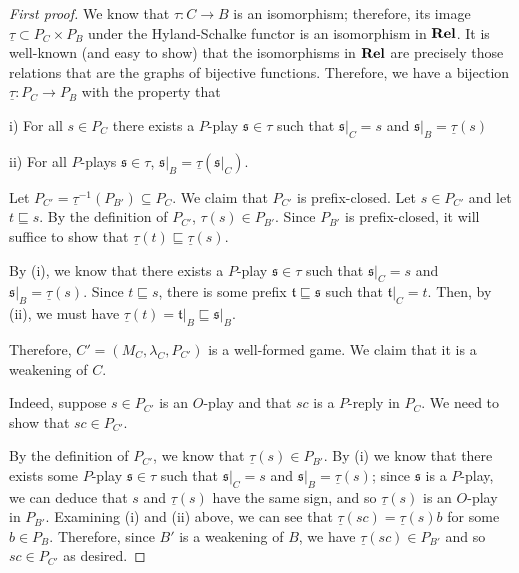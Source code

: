 \documentclass[11pt]{article} %
\theoremstyle{plain} %
\theoremstyle{definition} %
\theoremstyle{exercisestyle}
\newcommand{\catname}[1]{{\normalfont\textbf{#1}}}
\newcommand{\Rel}{\catname{Rel}}
\newcommand*\from{\colon}
\newcommand{\cmap}[3]{#1\from{}#2\to{}#3}
\def \inv {^{-1}}
\newcommand{\s}{\mathfrak{s}}
\renewcommand{\t}{\mathfrak{t}}
\newcommand{\grel}[1]{\underline{#1}}
\newcommand{\prefix}{\sqsubseteq}
\begin{document}
\begin{proof}[First proof]
  We know that $\cmap{\tau}{C}{B}$ is an isomorphism; therefore, its image $\grel\tau\subset P_C\times P_B$ under the Hyland-Schalke functor is an isomorphism in $\Rel$.  It is well-known (and easy to show) that the isomorphisms in $\Rel$ are precisely those relations that are the graphs of bijective functions.  Therefore, we have a bijection $\cmap{\grel\tau}{P_C}{P_B}$ with the property that

  i) For all $s\in P_C$ there exists a $P$-play $\s\in\tau$ such that $\s\vert_C=s$ and $\s\vert_B=\grel\tau(s)$

  ii) For all $P$-plays $\s\in\tau$, $\s\vert_B=\grel\tau\left(\s\vert_C\right)$.

  Let $P_{C'}=\grel\tau\inv(P_{B'})\subseteq P_C$.  We claim that $P_{C'}$ is prefix-closed.  Let $s\in P_{C'}$ and let $t\prefix s$.  By the definition of $P_{C'}$, $\tau(s)\in P_{B'}$.  Since $P_{B'}$ is prefix-closed, it will suffice to show that $\grel\tau(t)\prefix\grel\tau(s)$.

  By (i), we know that there exists a $P$-play $\s\in\tau$ such that $\s\vert_C = s$ and $\s\vert_B = \grel\tau(s)$.  Since $t\prefix s$, there is some prefix $\t\prefix\s$ such that $\t\vert_C = t$.  Then, by (ii), we must have $\grel\tau(t)=\t\vert_B\prefix\s\vert_B$.

  Therefore, $C'=(M_C,\lambda_C, P_{C'})$ is a well-formed game.  We claim that it is a weakening of $C$.  

  Indeed, suppose $s\in P_{C'}$ is an $O$-play and that $sc$ is a $P$-reply in $P_C$.  We need to show that $sc\in P_{C'}$.  

  By the definition of $P_{C'}$, we know that $\grel\tau(s)\in P_{B'}$.  By (i) we know that there exists some $P$-play $\s\in\tau$ such that $\s\vert_C=s$ and $\s\vert_B=\grel\tau(s)$; since $\s$ is a $P$-play, we can deduce that $s$ and $\grel\tau(s)$ have the same sign, and so $\grel\tau(s)$ is an $O$-play in $P_{B'}$.  Examining (i) and (ii) above, we can see that $\grel\tau(sc)=\grel\tau(s)b$ for some $b\in P_B$.  Therefore, since $B'$ is a weakening of $B$, we have $\grel\tau(sc)\in P_{B'}$ and so $sc\in P_{C'}$ as desired.


\end{proof}
\end{document}
